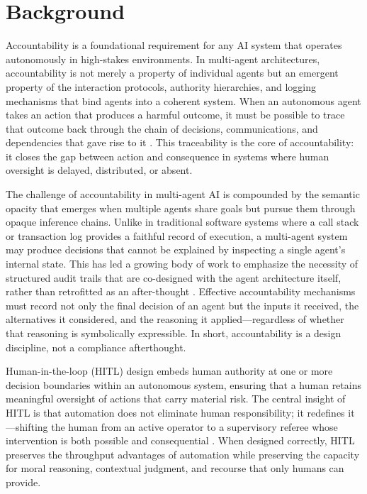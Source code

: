 \section{Background}

Accountability is a foundational requirement for any AI system that
operates autonomously in high-stakes environments.  In multi-agent
architectures, accountability is not merely a property of individual
agents but an emergent property of the interaction protocols,
authority hierarchies, and logging mechanisms that bind agents into a
coherent system.  When an autonomous agent takes an action that
produces a harmful outcome, it must be possible to trace that outcome
back through the chain of decisions, communications, and dependencies
that gave rise to it \cite{dijkstra1982}.  This traceability is the
core of accountability: it closes the gap between action and consequence
in systems where human oversight is delayed, distributed, or absent.

The challenge of accountability in multi-agent AI is compounded by the
semantic opacity that emerges when multiple agents share goals but
pursue them through opaque inference chains.  Unlike in traditional
software systems where a call stack or transaction log provides a
faithful record of execution, a multi-agent system may produce
decisions that cannot be explained by inspecting a single agent's
internal state.  This has led a growing body of work to emphasize the
necessity of structured audit trails that are co-designed with the
agent architecture itself, rather than retrofitted as an after-thought
\cite{bansal2019}.  Effective accountability mechanisms must record not
only the final decision of an agent but the inputs it received, the
alternatives it considered, and the reasoning it applied—regardless of
whether that reasoning is symbolically expressible.  In short,
accountability is a design discipline, not a compliance afterthought.

Human-in-the-loop (HITL) design embeds human authority at one or more
decision boundaries within an autonomous system, ensuring that a human
retains meaningful oversight of actions that carry material risk.  The
central insight of HITL is that automation does not eliminate human
responsibility; it redefines it—shifting the human from an active
operator to a supervisory referee whose intervention is both possible
and consequential \cite{wiener1948}.  When designed correctly, HITL
preserves the throughput advantages of automation while preserving the
capacity for moral reasoning, contextual judgment, and recourse that
only humans can provide.

